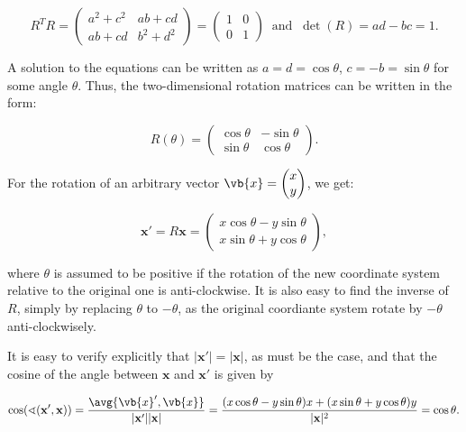 \documentclass[a4paper,12pt]{report}
\begin{document}
\begin{equation}
R^T R = \begin{pmatrix} a^2 + c^2 & ab + cd \\ ab + cd & b^2 + d^2 \end{pmatrix} = \begin{pmatrix} 1 & 0 \\ 0 & 1 \end{pmatrix} ~\text { and }~  
\det(R) = ad - bc = 1.
\end{equation}

A solution to the equations can be written as \(a = d = \cos\theta\), \(c = -b = \sin\theta\) for some angle \(\theta\). Thus, the two-dimensional rotation matrices can be written in the form:

\begin{equation}
R(\theta) = \begin{pmatrix} \cos \theta & -\sin \theta \\ \sin \theta & \cos \theta \end{pmatrix}.
\end{equation}

For the rotation of an arbitrary vector \(\vb{x} = \begin{pmatrix}
     x \\
     y \\
\end{pmatrix}\), we get:

\begin{equation}
\mathbf{x}' = R\mathbf{x} = \begin{pmatrix} x \cos \theta - y \sin \theta \\ x \sin \theta + y \cos \theta \end{pmatrix},
\end{equation}

where \(\theta \) is assumed to be positive if the rotation of the new coordinate system relative to the original one is anti-clockwise. It is also easy to find the inverse of \(R\), simply by replacing \(\theta \) to \(- \theta \), as the original coordiante system rotate by \(- \theta \) anti-clockwisely.     

It is easy to verify explicitly that \(|\mathbf{x}'| = |\mathbf{x}|\), as must be the case, and that the cosine of the angle between \(\mathbf{x}\) and \(\mathbf{x}'\) is given by

\begin{equation}
\cos(\sphericalangle (\mathbf{x}', \mathbf{x} )) = \frac{\avg{\vb{x} ',\vb{x} } }{|\mathbf{x}'||\mathbf{x}|} = \frac{(x \cos \theta - y \sin \theta)x + (x \sin \theta + y \cos \theta)y}{|\mathbf{x}|^2} = \cos \theta.
\end{equation}
\end{document}
